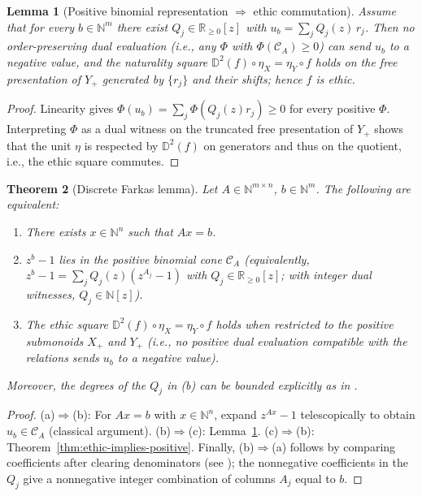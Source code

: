 \documentclass[12pt]{article}
\newcommand{\DD}{\mathbb{D}}
\theoremstyle{plain}
\newtheorem{theorem}{Theorem}[section]
\newtheorem{lemma}[theorem]{Lemma}
\theoremstyle{definition}
\theoremstyle{remark}
\numberwithin{equation}{section}
\begin{document}
\begin{lemma}[Positive binomial representation $\Rightarrow$ ethic commutation]\label{lem:positive-implies-ethic}
Assume that for every $b\in\mathbb N^m$ there exist $Q_j\in\mathbb R_{\ge 0}[z]$ with $u_b=\sum_j Q_j(z)\,r_j$. Then no order-preserving dual evaluation (i.e., any $\Phi$ with $\Phi(\mathcal C_A)\ge 0$) can send $u_b$ to a negative value, and the naturality square $\DD^2(f)\circ \eta_X=\eta_Y\circ f$ holds on the free presentation of $Y_+$ generated by $\{r_j\}$ and their shifts; hence $f$ is ethic.
\end{lemma}

\begin{proof}
Linearity gives $\Phi(u_b)=\sum_j \Phi(Q_j(z)r_j)\ge 0$ for every positive $\Phi$. Interpreting $\Phi$ as a dual witness on the truncated free presentation of $Y_+$ shows that the unit $\eta$ is respected by $\DD^2(f)$ on generators and thus on the quotient, i.e., the ethic square commutes.
\end{proof}

\begin{theorem}[Discrete Farkas lemma]\label{thm:discrete-farkas-derived}
Let $A\in\mathbb N^{m\times n}$, $b\in\mathbb N^m$. The following are equivalent:
\begin{enumerate}[label=(\alph*)]
\item There exists $x\in\mathbb N^n$ such that $Ax=b$.
\item $z^b-1$ lies in the positive binomial cone $\mathcal C_A$ (equivalently, $z^b-1=\sum_j Q_j(z)(z^{A_j}-1)$ with $Q_j\in\mathbb R_{\ge 0}[z]$; with integer dual witnesses, $Q_j\in\mathbb N[z]$).
\item The ethic square $\DD^2(f)\circ \eta_X=\eta_Y\circ f$ holds when restricted to the positive submonoids $X_+$ and $Y_+$ (i.e., no positive dual evaluation compatible with the relations sends $u_b$ to a negative value).
\end{enumerate}
Moreover, the degrees of the $Q_j$ in (b) can be bounded explicitly as in \cite{Lasserre2003}.
\end{theorem}

\begin{proof}
(a)$\Rightarrow$(b): For $Ax=b$ with $x\in\mathbb N^n$, expand $z^{Ax}-1$ telescopically to obtain $u_b\in \mathcal C_A$ (classical argument).  
(b)$\Rightarrow$(c): Lemma~\ref{lem:positive-implies-ethic}.  
(c)$\Rightarrow$(b): Theorem~\ref{thm:ethic-implies-positive}.  
Finally, (b)$\Rightarrow$(a) follows by comparing coefficients after clearing denominators (see \cite{Lasserre2003}); the nonnegative coefficients in the $Q_j$ give a nonnegative integer combination of columns $A_j$ equal to $b$.
\end{proof}
\end{document}
